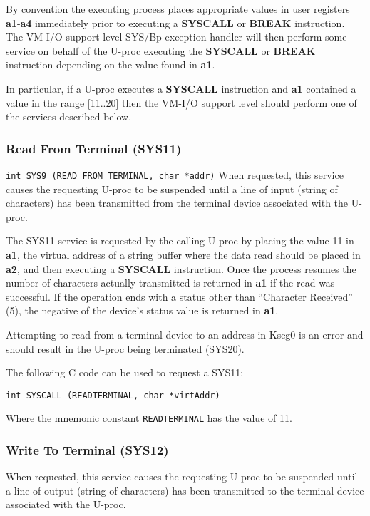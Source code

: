By convention the executing process places appropriate values in user registers \textbf{a1}-\textbf{a4} immediately prior to executing a \textbf{SYSCALL} or \textbf{BREAK} instruction. 
The VM-I/O support level SYS/Bp exception handler will then perform some service on behalf of the U-proc executing the \textbf{SYSCALL} or \textbf{BREAK} instruction depending on the value found in \textbf{a1}.

In particular, if a U-proc executes a \textbf{SYSCALL} instruction and \textbf{a1} contained a value in the range [11..20] then the VM-I/O support level should perform one of the services described below.


\subsubsection{Read From Terminal (SYS11)}
\verb+int SYS9 (READ FROM TERMINAL, char *addr)+ When requested, this service causes the requesting U-proc to be suspended until a line of input (string of characters) has been transmitted from the terminal device associated with the U-proc.

The SYS11 service is requested by the calling U-proc by placing the value 11 in \textbf{a1}, the virtual address of a string buffer where the data read should be placed in \textbf{a2}, and then executing a \textbf{SYSCALL} instruction. Once the process resumes the number of characters actually transmitted is returned in \textbf{a1} if the read was successful. If the operation ends with a status other than ``Character Received'' (5), the negative of the device's status value is returned in \textbf{a1}.

Attempting to read from a terminal device to an address in Kseg0 is an error and should result in the U-proc being terminated (SYS20).

The following C code can be used to request a SYS11:
\begin{center}
\verb+int SYSCALL (READTERMINAL, char *virtAddr)+
\end{center}
Where the mnemonic constant \verb+READTERMINAL+ has the value of 11.


\subsubsection{Write To Terminal (SYS12)}
When requested, this service causes the requesting U-proc to be suspended until a line of output (string of characters) has been transmitted to the terminal device associated with the U-proc.

